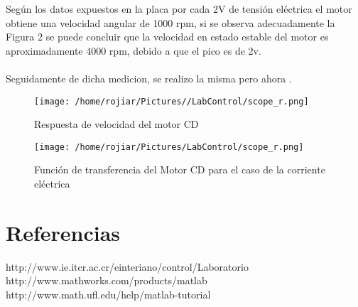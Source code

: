 \documentclass[a4paper,10pt,twocolumn]{article}
\begin{document}
Según los datos expuestos en la placa por cada 2V de tensión eléctrica el motor obtiene una velocidad angular de 1000 rpm, si se observa
adecuadamente la Figura 2 se puede concluir que la velocidad en estado estable del motor es aproximadamente 4000 rpm, debido a que el pico
es de 2v.
\\\\
Seguidamente de dicha medicion, se realizo la misma pero ahora .
\newpage

\begin{figure}[h]
\centering
\texttt{[image: /home/rojiar/Pictures//LabControl/scope\_r.png]}
\caption{Respuesta de velocidad del motor CD}
\label{Respuesta de velocidad del motor CD}
\end{figure}



\newpage








\begin{figure}[h!]
\centering
\texttt{[image: /home/rojiar/Pictures/LabControl/scope\_r.png]}
\caption{Función de transferencia del Motor CD para el caso de la corriente eléctrica}
\label{Funcion de transferencia del Motor CD para el caso de la corriente electrica}
\end{figure}



\section{Referencias}

http://www.ie.itcr.ac.cr/einteriano/control/Laboratorio
http://www.mathworks.com/products/matlab\\
http://www.math.ufl.edu/help/matlab-tutorial
\end{document}
